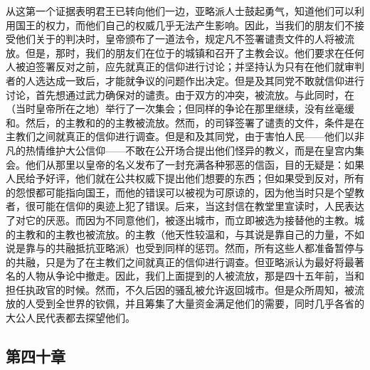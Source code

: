 从这第一个证据表明君王已转向他们一边，亚略派人士鼓起勇气，知道他们可以利用国王的权力，而他们自己的权威几乎无法产生影响。因此，当我们的朋友们不接受他们关于的判决时，皇帝颁布了一道法令，规定凡不签署谴责文件的人将被流放。但是，那时，我们的朋友们在位于的城镇和召开了主教会议。他们要求在任何人被迫签署反对之前，应先就真正的信仰进行讨论；并坚持认为只有在他们就审判者的人选达成一致后，才能就争议的问题作出决定。但是及其同党不敢就信仰进行讨论，首先想通过武力确保对的谴责。由于双方的冲突，被流放。与此同时，在（当时皇帝所在之地）举行了一次集会；但同样的争论在那里继续，没有丝毫缓和。然后，的主教和的的主教被流放。然而，的司铎签署了谴责的文件，条件是在主教们之间就真正的信仰进行调查。但是和及其同党，由于害怕人民——他们以非凡的热情维护大公信仰——不敢在公开场合提出他们怪异的教义，而是在皇宫内集会。他们从那里以皇帝的名义发布了一封充满各种邪恶的信函，目的无疑是：如果人民给予好评，他们就在公共权威下提出他们想要的东西；但如果受到反对，所有的怨恨都可能指向国王，而他的错误可以被视为可原谅的，因为他当时只是个望教者，很可能在信仰的奥迹上犯了错误。后来，当这封信在教堂里宣读时，人民表达了对它的厌恶。而因为不同意他们，被逐出城市，而立即被选为接替他的主教。城的主教和的主教也被流放。的主教（他天性较温和，与其说是靠自己的力量，不如说是靠与的共融抵抗亚略派）也受到同样的惩罚。然而，所有这些人都准备暂停与的共融，只是为了在主教们之间就真正的信仰进行调查。但亚略派认为最好将最著名的人物从争论中撤走。因此，我们上面提到的人被流放，那是四十五年前，当和担任执政官的时候。然而，不久后因的骚乱被允许返回城市。但是众所周知，被流放的人受到全世界的钦佩，并且筹集了大量资金满足他们的需要，同时几乎各省的大公人民代表都去探望他们。\par


\subsection{第四十章}

